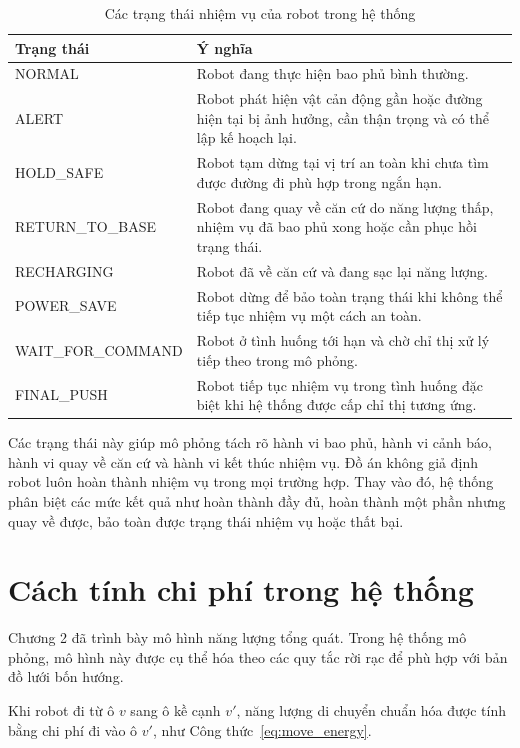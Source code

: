 \documentclass[../DoAn.tex]{subfiles}
\begin{document}
\begin{table}[!htbp]
\centering
\caption{Các trạng thái nhiệm vụ của robot trong hệ thống}
\label{tab:robot_modes}
\small
\setlength{\tabcolsep}{4pt}
\renewcommand{\arraystretch}{1.05}
\begin{tabular}{|L{0.3\textwidth}|L{0.6\textwidth}|}
\hline
\textbf{Trạng thái} & \textbf{Ý nghĩa} \\
\hline
NORMAL & Robot đang thực hiện bao phủ bình thường. \\
\hline
ALERT & Robot phát hiện vật cản động gần hoặc đường hiện tại bị ảnh hưởng, cần thận trọng và có thể lập kế hoạch lại. \\
\hline
HOLD\_SAFE & Robot tạm dừng tại vị trí an toàn khi chưa tìm được đường đi phù hợp trong ngắn hạn. \\
\hline
RETURN\_TO\_BASE & Robot đang quay về căn cứ do năng lượng thấp, nhiệm vụ đã bao phủ xong hoặc cần phục hồi trạng thái. \\
\hline
RECHARGING & Robot đã về căn cứ và đang sạc lại năng lượng. \\
\hline
POWER\_SAVE & Robot dừng để bảo toàn trạng thái khi không thể tiếp tục nhiệm vụ một cách an toàn. \\
\hline
WAIT\_FOR\_COMMAND & Robot ở tình huống tới hạn và chờ chỉ thị xử lý tiếp theo trong mô phỏng. \\
\hline
FINAL\_PUSH & Robot tiếp tục nhiệm vụ trong tình huống đặc biệt khi hệ thống được cấp chỉ thị tương ứng. \\
\hline
\end{tabular}
\end{table}

Các trạng thái này giúp mô phỏng tách rõ hành vi bao phủ, hành vi cảnh báo, hành vi quay về căn cứ và hành vi kết thúc nhiệm vụ. Đồ án không giả định robot luôn hoàn thành nhiệm vụ trong mọi trường hợp. Thay vào đó, hệ thống phân biệt các mức kết quả như hoàn thành đầy đủ, hoàn thành một phần nhưng quay về được, bảo toàn được trạng thái nhiệm vụ hoặc thất bại.

\section{Cách tính chi phí trong hệ thống}

Chương 2 đã trình bày mô hình năng lượng tổng quát. Trong hệ thống mô phỏng, mô hình này được cụ thể hóa theo các quy tắc rời rạc để phù hợp với bản đồ lưới bốn hướng.

Khi robot đi từ ô $v$ sang ô kề cạnh $v'$, năng lượng di chuyển chuẩn hóa được tính bằng chi phí đi vào ô $v'$, như Công thức~\ref{eq:move_energy}.
\end{document}
